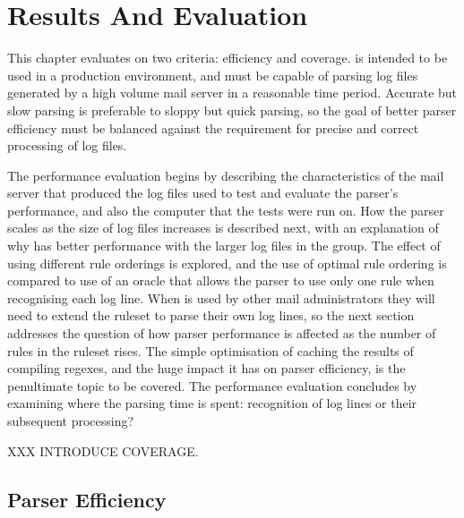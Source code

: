 \chapter{Results And Evaluation}

\label{Results}

\renewcommand{\figurename}{Graph}

\addtolength{\tabcolsep}{-2pt}

This chapter evaluates \parsername{} on two criteria: efficiency and
coverage.  \parsername{} is intended to be used in a production
environment, and must be capable of parsing log files generated by a high
volume mail server in a reasonable time period.  Accurate but slow parsing
is preferable to sloppy but quick parsing, so the goal of better parser
efficiency must be balanced against the requirement for precise and correct
processing of log files.

The performance evaluation begins by describing the characteristics of the
mail server that produced the log files used to test and evaluate the
parser's performance, and also the computer that the tests were run on.
How the parser scales as the size of log files increases is described next,
with an explanation of why \parsername{} has better performance with the
larger log files in the group.  The effect of using different rule
orderings is explored, and the use of optimal rule ordering is compared to
use of an oracle that allows the parser to use only one rule when
recognising each log line.  When \parsername{} is used by other mail
administrators they will need to extend the ruleset to parse their own log
lines, so the next section addresses the question of how parser performance
is affected as the number of rules in the ruleset rises.  The simple
optimisation of caching the results of compiling regexes, and the huge
impact it has on parser efficiency, is the penultimate topic to be covered.
The performance evaluation concludes by examining where the parsing time is
spent: recognition of log lines or their subsequent processing?

XXX INTRODUCE COVERAGE\@.

\section{Parser Efficiency}

\label{parser efficiency}

